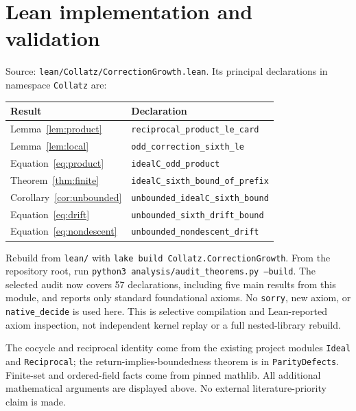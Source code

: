 \documentclass[11pt]{article}
\begin{document}
\section{Lean implementation and validation}
Source: \texttt{lean/Collatz/CorrectionGrowth.lean}. Its principal declarations in namespace \texttt{Collatz} are:
\begin{center}\small
\begin{tabular}{lp{9.2cm}}
\toprule
Result&Declaration\\
\midrule
Lemma~\ref{lem:product}&\texttt{reciprocal\_product\_le\_card}\\
Lemma~\ref{lem:local}&\texttt{odd\_correction\_sixth\_le}\\
Equation~\eqref{eq:product}&\texttt{idealC\_odd\_product}\\
Theorem~\ref{thm:finite}&\texttt{idealC\_sixth\_bound\_of\_prefix}\\
Corollary~\ref{cor:unbounded}&\texttt{unbounded\_idealC\_sixth\_bound}\\
Equation~\eqref{eq:drift}&\texttt{unbounded\_sixth\_drift\_bound}\\
Equation~\eqref{eq:nondescent}&\texttt{unbounded\_nondescent\_drift}\\
\bottomrule
\end{tabular}\end{center}
Rebuild from \texttt{lean/} with \texttt{lake build Collatz.CorrectionGrowth}. From the repository root, run \texttt{python3 analysis/audit\_theorems.py --build}. The selected audit now covers 57 declarations, including five main results from this module, and reports only standard foundational axioms. No \texttt{sorry}, new axiom, or \texttt{native\_decide} is used here. This is selective compilation and Lean-reported axiom inspection, not independent kernel replay or a full nested-library rebuild.

The cocycle and reciprocal identity come from the existing project modules \texttt{Ideal} and \texttt{Reciprocal}; the return-implies-boundedness theorem is in \texttt{ParityDefects}. Finite-set and ordered-field facts come from pinned mathlib. All additional mathematical arguments are displayed above. No external literature-priority claim is made.

\newpage
\end{document}
